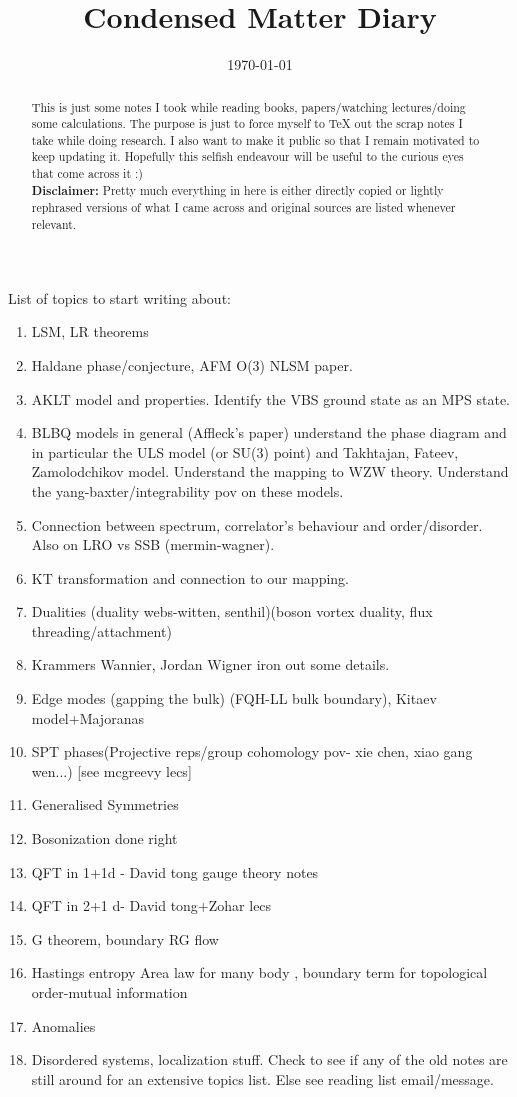 \documentclass{article}
\title{Condensed Matter Diary}
\author{}
\date{\today}
\begin{document}
\maketitle
\begin{abstract}
    This is just some notes I took while reading books, papers/watching lectures/doing some calculations. The purpose is just to force myself to TeX out the scrap notes I take while doing research. I also want to make it public so that I remain motivated to keep updating it. Hopefully this selfish endeavour will be useful to the curious eyes that come across it :)\\
    \textbf{Disclaimer:} Pretty much everything in here is either directly copied or lightly rephrased versions of what I came across and original sources are listed whenever relevant.
\end{abstract}
List of topics to start writing about:
\begin{enumerate}
    \item LSM, LR theorems
    \item Haldane phase/conjecture, AFM O(3) NLSM paper.
    \item AKLT model and properties. Identify the VBS ground state as an MPS state.
    \item BLBQ models in general (Affleck's paper) understand the phase diagram and in particular the ULS model (or SU(3) point) and Takhtajan, Fateev, Zamolodchikov model. Understand the mapping to WZW theory. Understand the yang-baxter/integrability pov on these models.
    \item Connection between spectrum, correlator's behaviour and order/disorder. Also on LRO vs SSB (mermin-wagner).
    \item KT transformation and connection to our mapping.
    \item Dualities (duality webs-witten, senthil)(boson vortex duality, flux threading/attachment)
    \item Krammers Wannier, Jordan Wigner iron out some details.
    \item Edge modes (gapping the bulk) (FQH-LL bulk boundary), Kitaev model+Majoranas
    \item SPT phases(Projective reps/group cohomology pov- xie chen, xiao gang wen...) [see mcgreevy lecs]
    \item Generalised Symmetries
    \item Bosonization done right
    \item QFT in 1+1d - David tong gauge theory notes
    \item QFT in 2+1 d- David tong+Zohar lecs
    \item G theorem, boundary RG flow
    \item Hastings entropy Area law for many body , boundary term for topological order-mutual information
    \item Anomalies
    \item Disordered systems, localization stuff. Check to see if any of the old notes are still around for an extensive topics list. Else see reading list email/message.
\end{enumerate}
\end{document}
